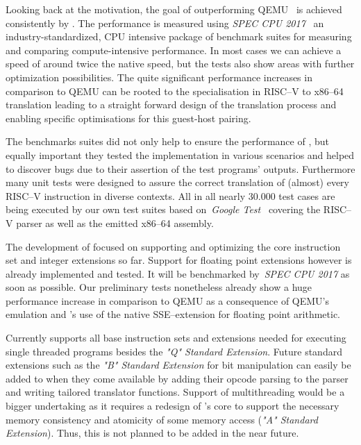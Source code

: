 Looking back at the motivation, the goal of outperforming QEMU~\cite{bellard2005qemu} is achieved consistently by \translatorname.
The performance is measured using \textit{SPEC CPU 2017}~\cite{spec-cpu-2017} an industry-standardized, CPU intensive package of benchmark suites for measuring and comparing compute-intensive performance.
In most cases we can achieve a speed of around twice the native speed, but the tests also show areas with further optimization possibilities. %
The quite significant performance increases in comparison to QEMU can be rooted to the specialisation in RISC--V to x86--64 translation leading to a straight forward design of the translation process and enabling specific optimisations for this guest-host pairing. %

The benchmarks suites did not only help to ensure the performance of \translatorname, but equally important they tested the implementation in various scenarios and helped to discover bugs due to their assertion of the test programs' outputs.
Furthermore many unit tests were designed to assure the correct translation of (almost) every RISC--V instruction in diverse contexts.
All in all nearly 30.000 test cases are being executed by our own test suites based on~\textit{Google Test}~\cite{gtest} covering the RISC--V parser as well as the emitted x86--64 assembly.

The development of \translatorname focused on supporting and optimizing the core instruction set and integer extensions so far.
Support for floating point extensions however is already implemented and tested.
It will be benchmarked by~\textit{SPEC CPU 2017} as soon as possible.
Our preliminary tests nonetheless already show a huge performance increase in comparison to QEMU as a consequence of QEMU's emulation and \translatorname's use of the native SSE--extension for floating point arithmetic.


Currently \translatorname supports all base instruction sets and extensions needed for executing single threaded programs besides the \textit{"Q" Standard Extension}.
Future standard extensions such as the \textit{"B" Standard Extension} for bit manipulation can easily be added to \translatorname when they come available by adding their opcode parsing to the parser and writing tailored translator functions. %
Support of multithreading would be a bigger undertaking as it requires a redesign of \translatorname's core to support the necessary memory consistency and atomicity of some memory access (\textit{"A" Standard Extension}).
Thus, this is not planned to be added in the near future.

